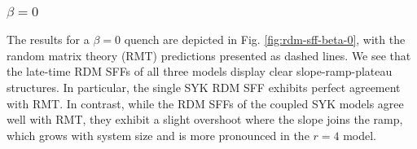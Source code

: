 \documentclass[reprint, floatfix,eqsecnum,superscriptaddress,preprint,nofootinbib,onecolumn,amsmath,amssymb,aps,prb]{revtex4-2}
\begin{document}
\subsubsection{\texorpdfstring{$\beta = 0$}{beta=0}}



\begin{figure*}%
  \caption{Late-time connected RDM spectral form factors after a quench from the $\ket{\widetilde{KM}_{\beta = 0}}$ state of Eq. \eqref{eqn:KM-indefinite-parity} in the (a) $r=4$, (b) $r=2$, and (c) single SYK models for $N=16,20,24,28,32$, with the ensemble averages taken over $16000,16000,3200,960,210$ disorder realizations, respectively. %
  The dashed lines indicate the Wishart ensemble SFF for the corresponding system size. }
  \label{fig:rdm-sff-beta-0}
\end{figure*}

The results for a $\beta=0$ quench are depicted in Fig. \ref{fig:rdm-sff-beta-0}, with the random matrix theory (RMT) predictions presented as dashed lines. 
We see that the late-time RDM SFFs of all three models display clear slope-ramp-plateau structures. %
In particular, the single SYK RDM SFF exhibits perfect agreement with RMT. 
In contrast, while the RDM SFFs of the coupled SYK models agree well with RMT, they exhibit a slight overshoot where the slope joins the ramp, which grows with system size and is more pronounced in the $r=4$ model.
\end{document}
